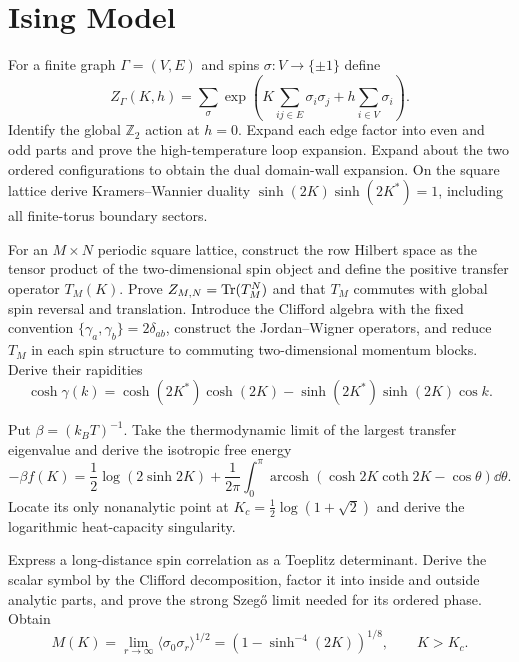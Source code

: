 \section{Ising Model}

\begin{exercise}
For a finite graph $\Gamma=(V,E)$ and spins $\sigma:V\to\{\pm1\}$ define
\[
 Z_\Gamma(K,h)=\sum_\sigma
 \exp\!\left(K\sum_{ij\in E}\sigma_i\sigma_j
 +h\sum_{i\in V}\sigma_i\right).
\]
Identify the global $\mathbb Z_2$ action at $h=0$.  Expand each edge factor
into even and odd parts and prove the high-temperature loop expansion.
Expand about the two ordered configurations to obtain the dual domain-wall
expansion.  On the square lattice derive Kramers--Wannier duality
$\sinh(2K)\sinh(2K^*)=1$, including all finite-torus boundary sectors.
\end{exercise}

\begin{exercise}
For an $M\times N$ periodic square lattice, construct the row Hilbert space
as the tensor product of the two-dimensional spin object and define the
positive transfer operator $T_M(K)$.  Prove
$Z_{M,N}=\operatorname{Tr}(T_M^N)$ and that $T_M$ commutes with global spin reversal and
translation.  Introduce the Clifford algebra with the fixed convention
$\{\gamma_a,\gamma_b\}=2\delta_{ab}$, construct the Jordan--Wigner operators,
and reduce $T_M$ in each spin structure to commuting two-dimensional momentum
blocks.  Derive their rapidities
\[
 \cosh\gamma(k)=\cosh(2K^*)\cosh(2K)
 -\sinh(2K^*)\sinh(2K)\cos k.
\]
\end{exercise}

\begin{exercise}
Put $\beta=(k_BT)^{-1}$.  Take the thermodynamic limit of the largest transfer
eigenvalue and derive
the isotropic free energy
\[
 -\beta f(K)=\frac12\log(2\sinh2K)
 +\frac1{2\pi}\int_0^\pi
 \operatorname{arcosh}(\cosh2K\coth2K-\cos\theta)\dd\theta.
\]
Locate its only nonanalytic point at
$K_c=\tfrac12\log(1+\sqrt2)$ and derive the logarithmic heat-capacity
singularity.
\end{exercise}

\begin{exercise}
Express a long-distance spin correlation as a Toeplitz determinant.  Derive
the scalar symbol by the Clifford decomposition, factor it into inside and
outside analytic parts, and prove the strong Szeg\H{o} limit needed for its
ordered phase.  Obtain
\[
 M(K)=\lim_{r\to\infty}\langle\sigma_0\sigma_r\rangle^{1/2}
 =\left(1-\sinh^{-4}(2K)\right)^{1/8},\qquad K>K_c.
\]
\end{exercise}

